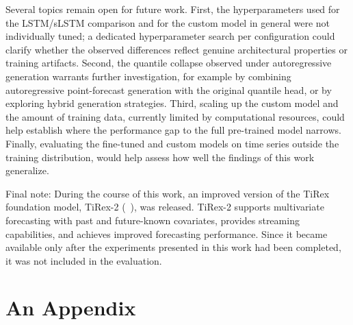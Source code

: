 \documentclass[a4paper,oneside,10pt,ngerman,english]{scrartcl}
\begin{document}
Several topics remain open for future work. First, the hyperparameters used for the LSTM/sLSTM comparison and for the custom model in general were not individually tuned; a dedicated hyperparameter search per configuration could clarify whether the observed differences reflect genuine architectural properties or training artifacts. Second, the quantile collapse observed under autoregressive generation warrants further investigation, for example by combining autoregressive point-forecast generation with the original quantile head, or by exploring hybrid generation strategies. Third, scaling up the custom model and the amount of training data, currently limited by computational resources, could help establish where the performance gap to the full pre-trained model narrows. Finally, evaluating the fine-tuned and custom models on time series outside the training distribution, would help assess how well the findings of this work generalize.

Final note: During the course of this work, an improved version of the TiRex foundation model, TiRex-2 (\citeauthor{podest2026tirex2generalizingtirexmultivariate}~\cite{podest2026tirex2generalizingtirexmultivariate}), was released. TiRex-2 supports multivariate forecasting with past and future-known covariates, provides streaming capabilities, and achieves improved forecasting performance. Since it became available only after the experiments presented in this work had been completed, it was not included in the evaluation.



\printbibliography

\appendix


\section{An Appendix}
\label{app:an-appendix}
\end{document}
